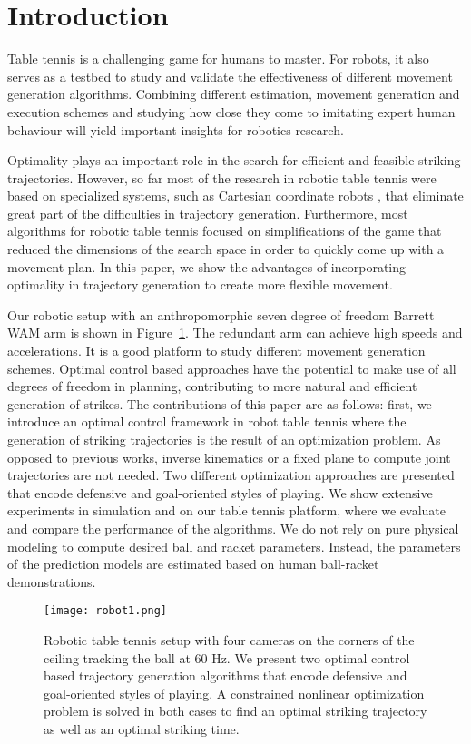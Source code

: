 \section{Introduction}

Table tennis is a challenging game for humans to master. For robots, it also serves as a testbed to study and validate the effectiveness of different movement generation algorithms. Combining different estimation, movement generation and execution schemes and studying how close they come to imitating expert human behaviour will yield important insights for robotics research.

Optimality plays an important role in the search for efficient and feasible striking trajectories. However, so far most of the research in robotic table tennis were based on specialized systems, such as Cartesian coordinate robots \citep{Matsushima05,Yanlong13}, that eliminate great part of the difficulties in trajectory generation. Furthermore, most algorithms for robotic table tennis focused on simplifications of the game that reduced the dimensions of the search space \citep{Muelling11} in order to quickly come up with a movement plan. In this paper, we show the advantages of incorporating optimality in trajectory generation to create more flexible movement. 

Our robotic setup with an anthropomorphic seven degree of freedom Barrett WAM arm is shown in Figure~\ref{robot}. The redundant arm can achieve high speeds and accelerations. It is a good platform to study different movement generation schemes. Optimal control based approaches have the potential to make use of all degrees of freedom in planning, contributing to more natural and efficient generation of strikes. %
%
The contributions of this paper are as follows: first, we introduce an optimal control framework in robot table tennis where the generation of striking trajectories is the result of an optimization problem. As opposed to previous works, inverse kinematics or a fixed plane to compute joint trajectories are not needed. Two different optimization approaches are presented that encode defensive and goal-oriented styles of playing. We show extensive experiments in simulation and on our table tennis platform, where we evaluate and compare the performance of the algorithms. We do not rely on pure physical modeling to compute desired ball and racket parameters. Instead, the parameters of the prediction models are estimated based on human ball-racket demonstrations.
%
\begin{figure}[t]
	\center
	\texttt{[image: robot1.png]}			
	\caption{Robotic table tennis setup with four cameras on the corners of the ceiling tracking the ball at 60 Hz. We present two optimal control based trajectory generation algorithms that encode defensive and goal-oriented styles of playing. A constrained nonlinear optimization problem is solved in both cases to find an optimal striking trajectory as well as an optimal striking time.	
	}
	\label{robot}
\end{figure}
